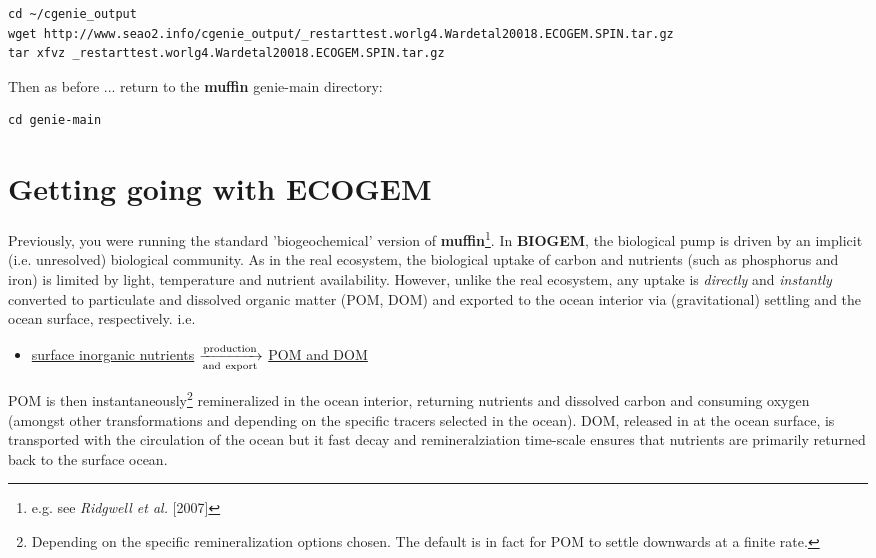 \documentclass[11pt,fleqn]{book} %
\begin{document}
\vspace{-2mm}
\footnotesize\begin{verbatim}
cd ~/cgenie_output
wget http://www.seao2.info/cgenie_output/_restarttest.worlg4.Wardetal20018.ECOGEM.SPIN.tar.gz
tar xfvz _restarttest.worlg4.Wardetal20018.ECOGEM.SPIN.tar.gz
\end{verbatim}\normalsize
\vspace{-2mm}

\noindent Then as before ... return to the \textbf{muffin} \footnotesize\textsf{genie-main }\normalsize directory:

\vspace{-2mm}
\small\begin{verbatim}
cd genie-main
\end{verbatim}\normalsize
\vspace{-2mm}


\newpage


\section{Getting going with ECOGEM}

Previously, you were running the standard 'biogeochemical' version of \textbf{muffin}\footnote{e.g. see \textit{Ridgwell et al.} [2007]}.  In \textbf{BIOGEM}, the biological pump is driven by an implicit (i.e. unresolved) biological community. As in the real ecosystem, the biological uptake of carbon and nutrients (such as phosphorus and iron) is limited by light, temperature and nutrient availability. However, unlike the real ecosystem, any uptake is \textit{directly} and \textit{instantly} converted to particulate and dissolved organic matter (POM, DOM) and exported to the ocean interior via (gravitational) settling and the ocean surface, respectively. i.e.
\vspace{4mm}
\begin{itemize}
\item \underline{surface inorganic nutrients} $\xrightarrow[\rm and~export]{\rm production}$ \underline{POM and DOM}
\end{itemize}
\vspace{4mm} 
POM is then instantaneously\footnote{Depending on the specific remineralization options chosen. The default is in fact for POM to settle downwards at a finite rate.} remineralized in the ocean interior, returning nutrients and dissolved carbon and consuming oxygen (amongst other transformations and depending on the specific tracers selected in the ocean). DOM, released in at the ocean surface, is transported with the circulation of the ocean but it fast decay and remineralziation time-scale ensures that nutrients are primarily returned  back to the surface ocean. 
\end{document}
